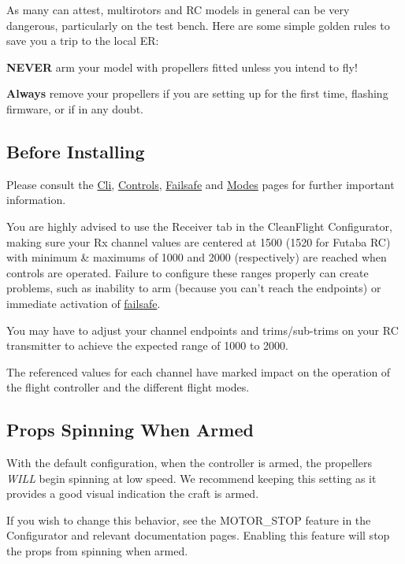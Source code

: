 As many can attest, multirotors and R\+C models in general can be very dangerous, particularly on the test bench. Here are some simple golden rules to save you a trip to the local E\+R\+:
\begin{DoxyItemize}
\item {\bfseries N\+E\+V\+E\+R} arm your model with propellers fitted unless you intend to fly!
\item {\bfseries Always} remove your propellers if you are setting up for the first time, flashing firmware, or if in any doubt.
\end{DoxyItemize}

\subsection*{Before Installing}

Please consult the \hyperlink{Cli_8md}{Cli}, \hyperlink{Controls_8md}{Controls}, \hyperlink{Failsafe_8md}{Failsafe} and \hyperlink{Modes_8md}{Modes} pages for further important information.

You are highly advised to use the Receiver tab in the Clean\+Flight Configurator, making sure your Rx channel values are centered at 1500 (1520 for Futaba R\+C) with minimum \& maximums of 1000 and 2000 (respectively) are reached when controls are operated. Failure to configure these ranges properly can create problems, such as inability to arm (because you can't reach the endpoints) or immediate activation of \hyperlink{Failsafe_8md}{failsafe}.

You may have to adjust your channel endpoints and trims/sub-\/trims on your R\+C transmitter to achieve the expected range of 1000 to 2000.

The referenced values for each channel have marked impact on the operation of the flight controller and the different flight modes.

\subsection*{Props Spinning When Armed}

With the default configuration, when the controller is armed, the propellers {\itshape W\+I\+L\+L} begin spinning at low speed. We recommend keeping this setting as it provides a good visual indication the craft is armed.

If you wish to change this behavior, see the M\+O\+T\+O\+R\+\_\+\+S\+T\+O\+P feature in the Configurator and relevant documentation pages. Enabling this feature will stop the props from spinning when armed. 